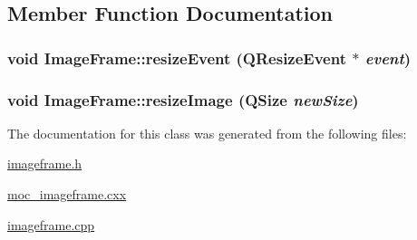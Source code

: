 \subsection{Member Function Documentation}
\hypertarget{classImageFrame_a03c4a3c033846294a43a2a87eb0b5f30}{
\subsubsection[{resizeEvent}]{\setlength{\rightskip}{0pt plus 5cm}void ImageFrame::resizeEvent (QResizeEvent $\ast$ {\em event})}}
\label{classImageFrame_a03c4a3c033846294a43a2a87eb0b5f30}
\hypertarget{classImageFrame_afc5c795cc06bab2f82d286084dc8eb14}{
\subsubsection[{resizeImage}]{\setlength{\rightskip}{0pt plus 5cm}void ImageFrame::resizeImage (QSize {\em newSize})}}
\label{classImageFrame_afc5c795cc06bab2f82d286084dc8eb14}


The documentation for this class was generated from the following files:\begin{DoxyCompactItemize}
\item 
\hyperlink{imageframe_8h}{imageframe.h}\item 
\hyperlink{moc__imageframe_8cxx}{moc\_\-imageframe.cxx}\item 
\hyperlink{imageframe_8cpp}{imageframe.cpp}\end{DoxyCompactItemize}
